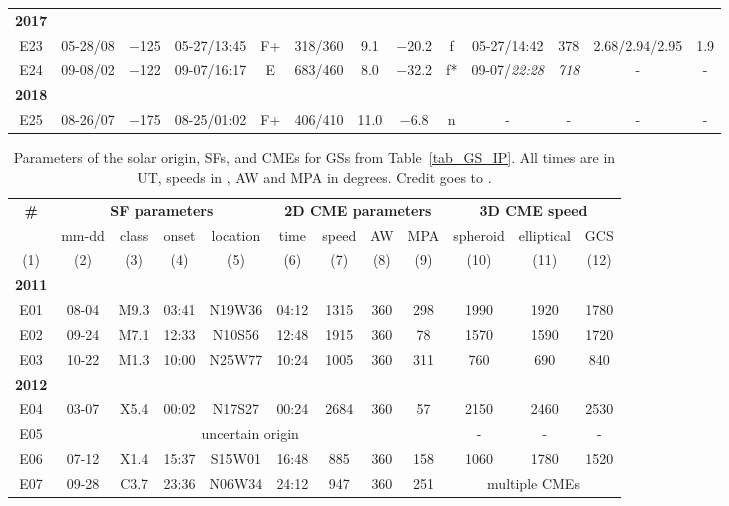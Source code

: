 \begin{landscape}
\begin{longtable}{ccccccccccccc}
			\textbf{2017}\\
			E23	& 05-28/08 & $-$125 & 05-27/13:45 & F+ & 318/360 & 9.1 & $-$20.2 &  f & 05-27/14:42 & 378 & 2.68/2.94/2.95 & 1.9	\\ 
			E24	& 09-08/02 & $-$122 & 09-07/16:17 & E & 683/460 &  8.0  & $-$32.2 &  f* & 09-07/{\it 22:28} & {\it 718} & - & - \\
			\textbf{2018}\\
			E25	& 08-26/07 & $-$175 & 08-25/01:02 & F+ & 406/410 & 11.0 & $-$6.8 &  n & - & - & - & - \\ 
			\bottomrule
		\end{longtable}
\end{landscape}

\begin{table}[!htp]
	\tiny
	\caption{Parameters of the solar origin, SFs, and CMEs for GSs from Table~\ref{tab_GS_IP}. All times are in UT, speeds in \kms, AW and MPA in degrees. Credit goes to \citet{miteva_2023}.}
	\label{tab_GS_sol}
	\begin{adjustbox}{width=\textwidth}
		\begin{tabular}{@{}cccccccccccc@{}}
			\toprule
			\textbf{\#}	& \multicolumn{4}{c}{\textbf{SF parameters}} & \multicolumn{4}{c}{\textbf{2D CME parameters}} & \multicolumn{3}{c}{\textbf{3D CME speed}} \\
			& mm-dd & class & onset & location & time & speed & AW & MPA & spheroid & elliptical & GCS  \\
			(1) & (2) & (3) & (4) & (5) & (6) & (7) & (8) & (9) & (10) & (11) & (12)  \\
			\midrule
			\textbf{2011}\\
			E01 & 08-04 & M9.3 & 03:41 & N19W36 & 04:12 & 1315 & 360 & 298 & 1990 & 1920 & 1780 \\
			E02 & 09-24 & M7.1 & 12:33 & N10S56 & 12:48 & 1915 & 360 & 78 & 1570 & 1590 & 1720 \\
			E03 & 10-22 & M1.3 & 10:00 & N25W77 & 10:24 & 1005 & 360 & 311 & 760 & 690 & 840 \\
			\textbf{2012} \\
			E04 & 03-07 & X5.4 & 00:02 & N17S27 & 00:24 & 2684 & 360 & 57 & 2150 & 2460 & 2530 \\
			E05 & \multicolumn{8}{c}{uncertain origin} & - & - & -\\
			E06 & 07-12 & X1.4 & 15:37 & S15W01 & 16:48 & 885 & 360 & 158 & 1060 & 1780 & 1520 \\
			E07 & 09-28 & C3.7 & 23:36 & N06W34 & 24:12 & 947 & 360 & 251 & \multicolumn{3}{c}{multiple CMEs}\\

\end{tabular}
\end{adjustbox}
\end{table}
